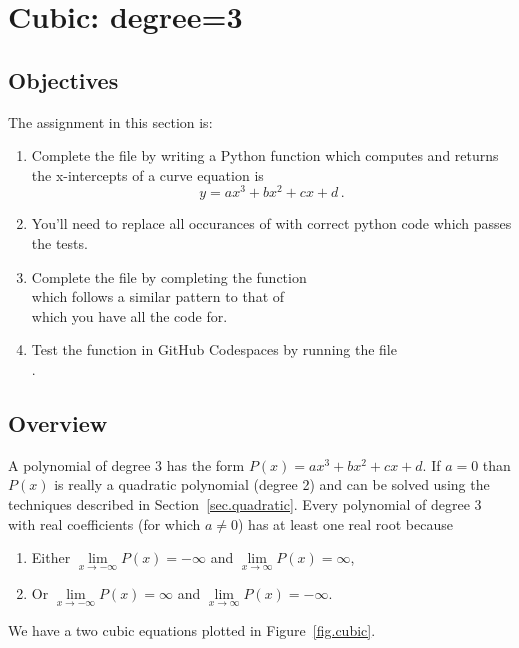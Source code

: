 \section{Cubic: degree=3}
\label{sec.cubic}

\subsection{Objectives}
The assignment in this section is:
\begin{enumerate}
\item Complete the file  by writing a Python
  function which computes and returns the x-intercepts of a curve
  equation is \[y=a x^3 + b x^2 + c x + d\,.\]
\item You'll need to replace all occurances of 
  with correct python code which passes the tests.

\item Complete the file  by completing the function \\
  which follows a similar pattern to that of \\
   which you have all the code for.

\item Test the function in GitHub Codespaces by running the file\\
  .
\end{enumerate}

\subsection{Overview}


A polynomial of degree 3 has the form $P(x) = a x^3 + b x^2 + c x + d$. If $a=0$ than $P(x)$ is really
a quadratic polynomial (degree 2) and can be solved using the techniques described in Section~\ref{sec.quadratic}.  Every polynomial of degree 3
with real coefficients (for which $a\neq 0$) has at least one real root because 
\begin{enumerate}
\item Either $\lim\limits_{x\to-\infty}P(x) = -\infty$ and $\lim\limits_{x\to\infty}P(x) = \infty$,
  \item Or $\lim\limits_{x\to-\infty}P(x) = \infty$ and $\lim\limits_{x\to\infty}P(x) = -\infty$.
\end{enumerate}


We have a two cubic equations plotted in Figure~\ref{fig.cubic}.

